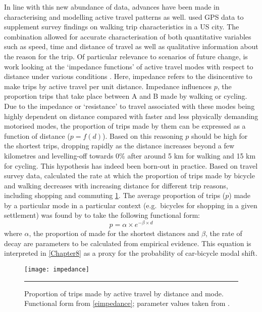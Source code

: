 In line with this new abundance of data, advances have been made in
characterising and 
modelling active travel patterns as well. \citet{Millward2013} used GPS
data to supplement survey findings on walking trip characteristics in a US
city. The combination allowed for accurate characterisation of both
quantitative variables such as speed, time and distance of travel as well
as qualitative information about the reason for the trip.
Of particular relevance to scenarios of
future change, is work looking at the `impedance functions' of active travel
modes with respect to distance under various conditions \citep{Iacono2010}.
Here, impedance refers to the disincentive to make trips by active travel per
unit distance.
Impedance influences $p$, the proportion trips that
take place between A and B made by walking or cycling. Due to the impedance or 
`resistance' to travel associated with these modes being highly dependent on distance
compared with faster and 
less physically demanding motorised modes, the proportion of trips made by them
can be expressed as a function of distance ($p = f(d)$). Based on this reasoning
$p$ should be high for the shortest
trips, dropping rapidly as the distance increases beyond a few kilometres
and levelling-off towards 0\%  after around 5 km for walking and 15 km for cycling. 
This hypothesis has indeed been born-out in practice.
Based on travel survey data, \citet{Iacono2010} calculated the rate
at which the proportion of trips made by bicycle and walking decreases
with increasing distance for different trip reasons, including shopping and
commuting \cref{fimpedance}.
The average proportion of trips ($p$) made by a particular mode in a particular context
(e.g.~bicycles for shopping in a given settlement) was found by \citet{Iacono2010}
to take the following functional form:
\begin{equation}
 p = \alpha \times e^{- \beta \times d}
 \label{eimpedance}
\end{equation}
where $\alpha$, the proportion of made for the shortest distances
and $\beta$, the rate of decay
are parameters to be calculated from empirical evidence. 
This equation is interpreted in \cref{Chapter8} as a proxy for the probability
of car-bicycle modal shift.


\begin{figure}[htbp]
  \centerline{
    \texttt{[image: impedance]}}
    \rule{35em}{0.5pt}
  \caption[Proportion of trips by active travel by distance and mode]
  {Proportion of trips made by active travel by distance and mode. Functional form
  from \cref{eimpedance}; parameter values taken from \citep{Iacono2010}.}
  \label{fimpedance}
\end{figure}

